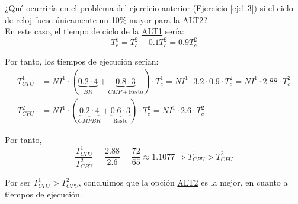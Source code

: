 \begin{ejercicio}
    ¿Qué ocurriría en el problema del ejercicio anterior (Ejercicio \ref{ej:1.3}) si el ciclo de reloj fuese únicamente un 10\% mayor para
    la \ul{ALT2}?\\

    En este caso, el tiempo de ciclo de la \ul{ALT1} sería:
    \begin{equation*}
        T_c^1 = T_c^2 - 0.1 T_c^2 = 0.9 T_c^2
    \end{equation*}

    Por tanto, los tiempos de ejecución serían:
    \begin{align*}
        T_{CPU}^1 &= NI^1 \cdot (\underbrace{0.2 \cdot 4}_{BR} + \underbrace{0.8 \cdot 3}_{CMP+\text{Resto}}) \cdot T_c^1 = NI^1 \cdot 3.2 \cdot 0.9 \cdot T_c^2 = NI^1 \cdot 2.88 \cdot T_c^2\\
        T_{CPU}^2 &= NI^1 \cdot (\underbrace{0.2 \cdot 4}_{CMPBR} + \underbrace{0.6\cdot 3}_{\text{Resto}}) \cdot T_c^2 = NI^1 \cdot 2.6 \cdot T_c^2
    \end{align*}

    Por tanto,
    \begin{equation*}
        \frac{T_{CPU}^1}{T_{CPU}^2} = \frac{2.88}{2.6} = \frac{72}{65} \approx 1.1077 \Longrightarrow T_{CPU}^1 > T_{CPU}^2
    \end{equation*}

    Por ser $T_{CPU}^1 > T_{CPU}^2$, concluimos que la opción \ul{ALT2} es la mejor, en cuanto a tiempos de ejecución.    
\end{ejercicio}

